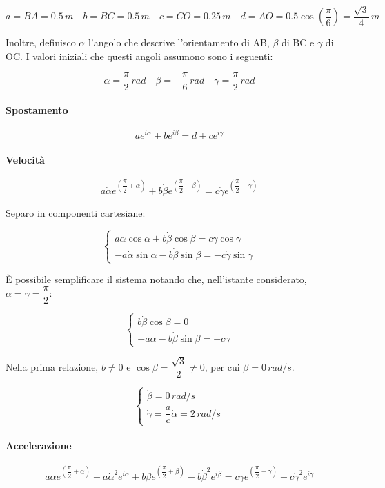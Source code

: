 \documentclass[main.tex]{subfiles}
\begin{document}
\[
	a = BA = 0.5\,m\quad
	b = BC = 0.5\,m\quad
	c = CO = 0.25\,m\quad
	d = AO = 0.5\cos\left( \dfrac{\pi}{6} \right ) = \dfrac{\sqrt{3}}{4}\,m
\]

Inoltre, definisco $\alpha$ l'angolo che descrive l'orientamento di AB, $\beta$ di BC e $\gamma$ di OC. I valori iniziali che questi angoli assumono sono i seguenti:

\[
	\alpha = \dfrac{\pi}{2}\,rad\quad
	\beta = -\dfrac{\pi}{6}\,rad\quad
	\gamma = \dfrac{\pi}{2}\,rad
\]

\paragraph{Spostamento}
\[
	ae^{i\alpha} + be^{i\beta} = d + ce^{i\gamma}
\]

\paragraph{Velocità}
\[
	a\dot{\alpha}e^{\left( \dfrac{\pi}{2} + \alpha \right )} + b\dot{\beta}e^{\left( \dfrac{\pi}{2} + \beta \right )} =  c\dot{\gamma}e^{\left( \dfrac{\pi}{2} + \gamma \right )}
\]

Separo in componenti cartesiane:

\[
\begin{cases}
	a\dot{\alpha}\cos\alpha + b\dot{\beta}\cos\beta = c\dot{\gamma}\cos\gamma\\
	-a\dot{\alpha}\sin\alpha - b\dot{\beta}\sin\beta = -c\dot{\gamma}\sin\gamma
\end{cases}
\]

È possibile semplificare il sistema notando che, nell'istante considerato, $\alpha = \gamma = \dfrac{\pi}{2}$:

\[
\begin{cases}
	b\dot{\beta}\cos\beta = 0\\
	-a\dot{\alpha} - b\dot{\beta}\sin\beta = -c\dot{\gamma}
\end{cases}
\]

Nella prima relazione, $b\neq0$ e $\cos\beta = \dfrac{\sqrt{3}}{2} \neq 0$, per cui $\dot{\beta} = 0\,rad/s$.

\[
\begin{cases}
	\dot{\beta} = 0\,rad/s\\
	\dot{\gamma} = \dfrac{a}{c}\dot{\alpha} = 2\,rad/s
\end{cases}
\]

\paragraph{Accelerazione}
\[
a\ddot{\alpha}e^{\left( \dfrac{\pi}{2} + \alpha \right )} - a\dot{\alpha}^2e^{i\alpha} + b\ddot{\beta}e^{\left( \dfrac{\pi}{2} + \beta \right )} - b\dot{\beta}^2e^{i\beta}=  c\ddot{\gamma}e^{\left( \dfrac{\pi}{2} + \gamma \right )}  - c\dot{\gamma}^2e^{i\gamma}
\]
\end{document}
